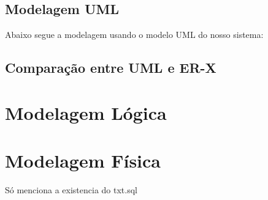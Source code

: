 \documentclass{article}
\begin{document}
	\subsection{Modelagem UML}
	Abaixo segue a modelagem usando o modelo UML do nosso sistema:\\

	\subsection{Comparação entre UML e ER-X}



\section{Modelagem Lógica}



\section{Modelagem Física}
	Só menciona a existencia do txt.sql
\end{document}
